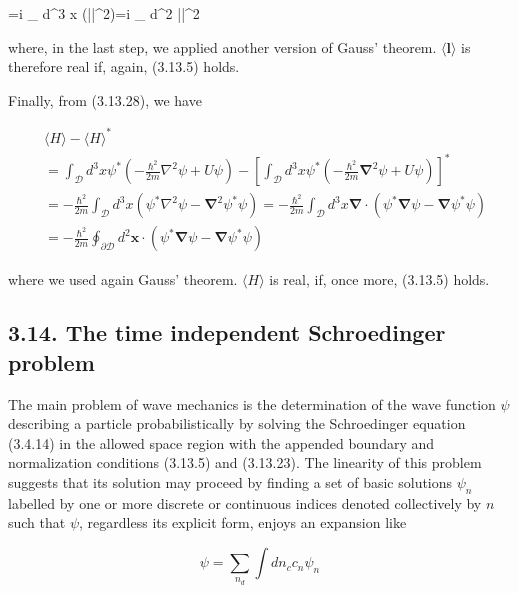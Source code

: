 \documentclass{article}
\begin{document}
 
=i \hbar \int_{} d^{3} x \boldsymbol{\nabla} \times\left(|\psi|^{2}\right)=i \hbar \oint_{ } d^{2}  \times {}|\psi|^{2}
 
where, in the last step, we applied another version of Gauss' theorem. $\langle\boldsymbol{l}\rangle$ is therefore real if, again, (3.13.5) holds.

Finally, from (3.13.28), we have
 
\begin{align*}
& \langle H\rangle-\langle H\rangle^{*}  \tag{3.13.32}\\
& =\int_{\mathcal{D}} d^{3} x \psi^{*}\left(-\frac{\hbar^{2}}{2 m} \nabla^{2} \psi+U \psi\right)-\left[\int_{\mathcal{D}} d^{3} x \psi^{*}\left(-\frac{\hbar^{2}}{2 m} \boldsymbol{\nabla}^{2} \psi+U \psi\right)\right]^{*} \\
& =-\frac{\hbar^{2}}{2 m} \int_{\mathcal{D}} d^{3} x\left(\psi^{*} \nabla^{2} \psi-\boldsymbol{\nabla}^{2} \psi^{*} \psi\right)=-\frac{\hbar^{2}}{2 m} \int_{\mathcal{D}} d^{3} x \boldsymbol{\nabla} \cdot\left(\psi^{*} \boldsymbol{\nabla} \psi-\boldsymbol{\nabla} \psi^{*} \psi\right) \\
& =-\frac{\hbar^{2}}{2 m} \oint_{\partial \mathcal{D}} d^{2} \boldsymbol{x} \cdot\left(\psi^{*} \boldsymbol{\nabla} \psi-\boldsymbol{\nabla} \psi^{*} \psi\right)
\end{align*}
 
where we used again Gauss' theorem. $\langle H\rangle$ is real, if, once more, (3.13.5) holds.

\subsection*{3.14. The time independent Schroedinger problem}

The main problem of wave mechanics is the determination of the wave function $\psi$ describing a particle probabilistically by solving the Schroedinger equation (3.4.14) in the allowed space region with the appended boundary and normalization conditions (3.13.5) and (3.13.23). The linearity of this problem suggests that its solution may proceed by finding a set of basic solutions $\psi_{n}$ labelled by one or more discrete or continuous indices denoted collectively by $n$ such that $\psi$, regardless its explicit form, enjoys an expansion like
 
\begin{equation*}
\psi=\sum_{n_{d}} \int d n_{c} c_{n} \psi_{n} \tag{3.14.1}
\end{equation*}
 
\end{document}
